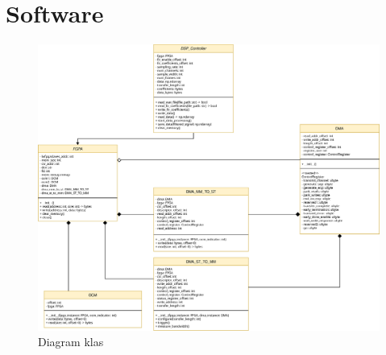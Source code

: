 \chapter{Software}
\label{cha:software}

\begin{figure}[!htb]
    \includegraphics[scale=0.53]{classDiagram.eps}
    \caption{Diagram klas}
    \label{fig:diagram-klas}
\end{figure}